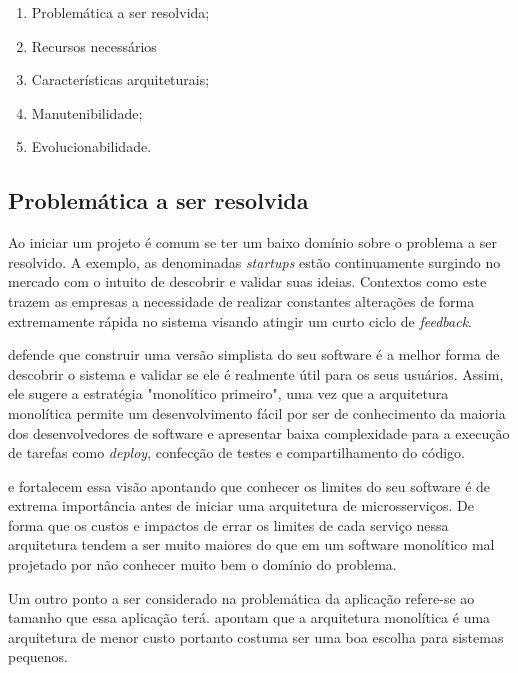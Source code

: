 \begin{enumerate}
    \item Problemática a ser resolvida;
    \item Recursos necessários
    \item Características arquiteturais;
    \item Manutenibilidade;
    \item Evolucionabilidade.
\end{enumerate}

\subsection{Problemática a ser resolvida}
\label{Perpectivas:Problematica}

Ao iniciar um projeto é comum se ter um baixo domínio sobre o problema a ser resolvido. A exemplo,
as denominadas \textit{startups} estão continuamente surgindo no mercado com o intuito de descobrir
e validar suas ideias. Contextos como este trazem as empresas a necessidade de realizar constantes
alterações de forma extremamente rápida no sistema visando atingir um curto ciclo de
\textit{feedback}.

 defende que construir uma versão simplista do seu software é
a melhor forma de descobrir o sistema e validar se ele é realmente útil para os seus usuários.
Assim, ele sugere a estratégia "monolítico primeiro", uma vez que a arquitetura monolítica permite
um desenvolvimento fácil por ser de conhecimento da maioria dos desenvolvedores de software e
apresentar baixa complexidade para a execução de tarefas como \textit{deploy}, confecção de testes
e compartilhamento do código.

 e  fortalecem essa visão apontando
que conhecer os limites do seu software é de extrema importância antes de iniciar uma arquitetura de
microsserviços. De forma que os custos e impactos de errar os limites de cada serviço nessa arquitetura
tendem a ser muito maiores do que em um software monolítico mal projetado por não conhecer muito bem o
domínio do problema. 

Um outro ponto a ser considerado na problemática da aplicação refere-se ao tamanho que essa
aplicação terá.  apontam que a arquitetura
monolítica é uma arquitetura de menor custo portanto costuma ser uma boa escolha para sistemas
pequenos.

